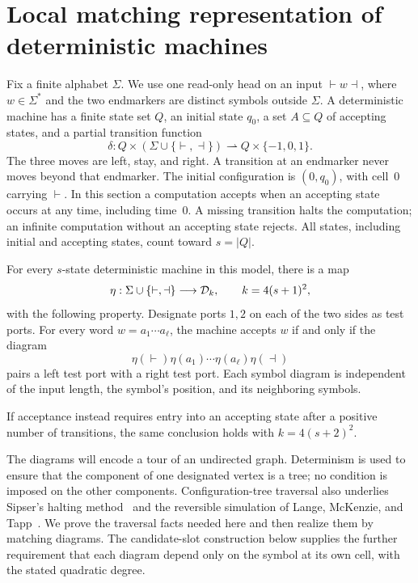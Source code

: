 \section{Local matching representation of deterministic machines}
\label{sec:machines}

Fix a finite alphabet $\Sigma$.  We use one read-only head on an input
$\vdash w\dashv$, where $w\in\Sigma^*$ and the two endmarkers are
distinct symbols outside $\Sigma$.  A deterministic machine has a finite
state set $Q$, an initial state $q_0$, a set $A\subseteq Q$ of accepting states,
and a partial transition function
\[
 \delta:Q\times(\Sigma\cup\{\vdash,\dashv\})
       \rightharpoonup Q\times\{-1,0,1\}.
\]
The three moves are left, stay, and right.  A transition at an endmarker
never moves beyond that endmarker.  The initial configuration is
$(0,q_0)$, with cell~$0$ carrying $\vdash$.  In this section a computation
accepts when an accepting state occurs at any time, including time~$0$.
A missing transition halts the computation; an infinite computation
without an accepting state rejects.  All states, including initial and
accepting states, count toward $s=|Q|$.

\begin{theorem}
\label{thm:machine-diagrams}
For every $s$-state deterministic machine in this model, there is a map
\[
 \eta:\Sigma\cup\{\vdash,\dashv\}\longrightarrow\mathcal D_{k},
 \qquad k=4(s+1)^2,
\]
with the following property.  Designate ports $1,2$ on each of the two
sides as test ports.  For every word $w=a_1\cdots a_\ell$, the machine
accepts $w$ if and only if the diagram
\[
 \eta(\vdash)\eta(a_1)\cdots\eta(a_\ell)\eta(\dashv)
\]
pairs a left test port with a right test port.  Each symbol diagram is
independent of the input length, the symbol's position, and its
neighboring symbols.

If acceptance instead requires entry into an accepting state after a
positive number of transitions, the same conclusion holds with
$k=4(s+2)^2$.
\end{theorem}

The diagrams will encode a tour of an undirected graph.  Determinism is
used to ensure that the component of one designated vertex is a tree;
no condition is imposed on the other components.
Configuration-tree traversal also underlies Sipser's halting
method~\cite{SipserHalting1980} and the reversible simulation of Lange,
McKenzie, and Tapp~\cite[Section~3.1]{LangeMcKenzieTapp2000}.
We prove the traversal facts needed here and then realize them by
matching diagrams. The candidate-slot construction below supplies
the further requirement that each diagram depend only on the symbol
at its own cell, with the stated quadratic degree.

